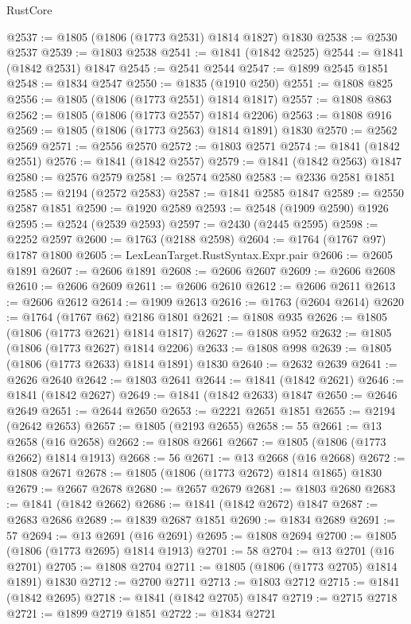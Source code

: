 \begin{lexlean}{RustCore}
\begin{coremodule}
@2537 := @1805 (@1806 (@1773 @2531) @1814 @1827) @1830
@2538 := @2530 @2537
@2539 := @1803 @2538
@2541 := @1841 (@1842 @2525)
@2544 := @1841 (@1842 @2531) @1847
@2545 := @2541 @2544
@2547 := @1899 @2545 @1851
@2548 := @1834 @2547
@2550 := @1835 (@1910 @250)
@2551 := @1808 @825
@2556 := @1805 (@1806 (@1773 @2551) @1814 @1817)
@2557 := @1808 @863
@2562 := @1805 (@1806 (@1773 @2557) @1814 @2206)
@2563 := @1808 @916
@2569 := @1805 (@1806 (@1773 @2563) @1814 @1891) @1830
@2570 := @2562 @2569
@2571 := @2556 @2570
@2572 := @1803 @2571
@2574 := @1841 (@1842 @2551)
@2576 := @1841 (@1842 @2557)
@2579 := @1841 (@1842 @2563) @1847
@2580 := @2576 @2579
@2581 := @2574 @2580
@2583 := @2336 @2581 @1851
@2585 := @2194 (@2572 @2583)
@2587 := @1841 @2585 @1847
@2589 := @2550 @2587 @1851
@2590 := @1920 @2589
@2593 := @2548 (@1909 @2590) @1926
@2595 := @2524 (@2539 @2593)
@2597 := @2430 (@2445 @2595)
@2598 := @2252 @2597
@2600 := @1763 (@2188 @2598)
@2604 := @1764 (@1767 @97) @1787 @1800
@2605 := LexLeanTarget.RustSyntax.Expr.pair
@2606 := @2605 @1891
@2607 := @2606 @1891
@2608 := @2606 @2607
@2609 := @2606 @2608
@2610 := @2606 @2609
@2611 := @2606 @2610
@2612 := @2606 @2611
@2613 := @2606 @2612
@2614 := @1909 @2613
@2616 := @1763 (@2604 @2614)
@2620 := @1764 (@1767 @62) @2186 @1801
@2621 := @1808 @935
@2626 := @1805 (@1806 (@1773 @2621) @1814 @1817)
@2627 := @1808 @952
@2632 := @1805 (@1806 (@1773 @2627) @1814 @2206)
@2633 := @1808 @998
@2639 := @1805 (@1806 (@1773 @2633) @1814 @1891) @1830
@2640 := @2632 @2639
@2641 := @2626 @2640
@2642 := @1803 @2641
@2644 := @1841 (@1842 @2621)
@2646 := @1841 (@1842 @2627)
@2649 := @1841 (@1842 @2633) @1847
@2650 := @2646 @2649
@2651 := @2644 @2650
@2653 := @2221 @2651 @1851
@2655 := @2194 (@2642 @2653)
@2657 := @1805 (@2193 @2655)
@2658 := 55
@2661 := @13 @2658 (@16 @2658)
@2662 := @1808 @2661
@2667 := @1805 (@1806 (@1773 @2662) @1814 @1913)
@2668 := 56
@2671 := @13 @2668 (@16 @2668)
@2672 := @1808 @2671
@2678 := @1805 (@1806 (@1773 @2672) @1814 @1865) @1830
@2679 := @2667 @2678
@2680 := @2657 @2679
@2681 := @1803 @2680
@2683 := @1841 (@1842 @2662)
@2686 := @1841 (@1842 @2672) @1847
@2687 := @2683 @2686
@2689 := @1839 @2687 @1851
@2690 := @1834 @2689
@2691 := 57
@2694 := @13 @2691 (@16 @2691)
@2695 := @1808 @2694
@2700 := @1805 (@1806 (@1773 @2695) @1814 @1913)
@2701 := 58
@2704 := @13 @2701 (@16 @2701)
@2705 := @1808 @2704
@2711 := @1805 (@1806 (@1773 @2705) @1814 @1891) @1830
@2712 := @2700 @2711
@2713 := @1803 @2712
@2715 := @1841 (@1842 @2695)
@2718 := @1841 (@1842 @2705) @1847
@2719 := @2715 @2718
@2721 := @1899 @2719 @1851
@2722 := @1834 @2721

\end{coremodule}
\end{lexlean}
